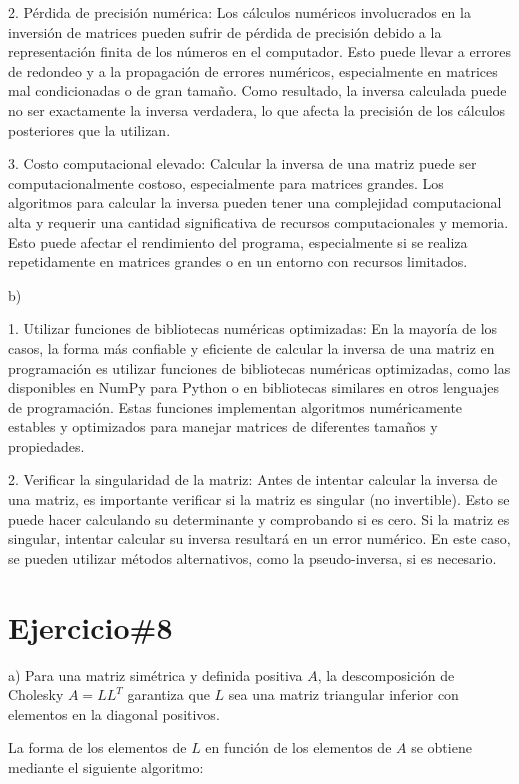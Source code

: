 \documentclass[a4paper,12pt]{article}
\begin{document}
2. Pérdida de precisión numérica: Los cálculos numéricos involucrados en la inversión de matrices pueden sufrir de pérdida de precisión debido a la representación finita de los números en el computador. Esto puede llevar a errores de redondeo y a la propagación de errores numéricos, especialmente en matrices mal condicionadas o de gran tamaño. Como resultado, la inversa calculada puede no ser exactamente la inversa verdadera, lo que afecta la precisión de los cálculos posteriores que la utilizan.

3. Costo computacional elevado: Calcular la inversa de una matriz puede ser computacionalmente costoso, especialmente para matrices grandes. Los algoritmos para calcular la inversa pueden tener una complejidad computacional alta y requerir una cantidad significativa de recursos computacionales y memoria. Esto puede afectar el rendimiento del programa, especialmente si se realiza repetidamente en matrices grandes o en un entorno con recursos limitados.

b)

1. Utilizar funciones de bibliotecas numéricas optimizadas: En la mayoría de los casos, la forma más confiable y eficiente de calcular la inversa de una matriz en programación es utilizar funciones de bibliotecas numéricas optimizadas, como las disponibles en NumPy para Python o en bibliotecas similares en otros lenguajes de programación. Estas funciones implementan algoritmos numéricamente estables y optimizados para manejar matrices de diferentes tamaños y propiedades.

2. Verificar la singularidad de la matriz: Antes de intentar calcular la inversa de una matriz, es importante verificar si la matriz es singular (no invertible). Esto se puede hacer calculando su determinante y comprobando si es cero. Si la matriz es singular, intentar calcular su inversa resultará en un error numérico. En este caso, se pueden utilizar métodos alternativos, como la pseudo-inversa, si es necesario.

\section*{Ejercicio\#8}

a)
Para una matriz simétrica y definida positiva \( A \), la descomposición de Cholesky \( A = LL^T \) garantiza que \( L \) sea una matriz triangular inferior con elementos en la diagonal positivos.

La forma de los elementos de \( L \) en función de los elementos de \( A \) se obtiene mediante el siguiente algoritmo:
\end{document}
